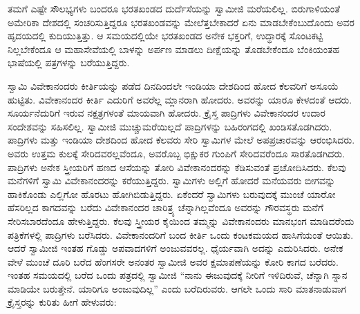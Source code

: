  ತಮಗೆ ಎಷ್ಟೇ ಸೌಲಭ್ಯಗಳು ಬಂದರೂ ಭರತಖಂಡದ ದುರ್ದೆಸೆಯನ್ನು ಸ್ವಾಮೀಜಿ ಮರೆಯಲಿಲ್ಲ. ಬಿರುಗಾಳಿಯಂತೆ ಅಮೇರಿಕಾ ದೇಶದಲ್ಲಿ ಸಂಚರಿಸುತ್ತಿದ್ದರೂ ಭರತಖಂಡವನ್ನು ಮೇಲೆತ್ತಬೇಕಾದರೆ ಏನು ಮಾಡಬೇಕೆಂಬುದೊಂದು ಅವರ ಹೃದಯದಲ್ಲಿ ಕುದಿಯುತ್ತಿತ್ತು. ಆ ಸಮಯದಲ್ಲಿಯೇ ಭರತಖಂಡದ ಅನೇಕ ಭಕ್ತರಿಗೆ, ಉದ್ಧಾರಕ್ಕೆ ಸೊಂಟಕಟ್ಟಿ ನಿಲ್ಲಬೇಕೆಂದೂ ಆ ಮಹಾಸೇವೆಯಲ್ಲಿ ಬಾಳನ್ನು ಅರ್ಪಣ ಮಾಡಲು ದೀಕ್ಷೆಯನ್ನು ತೊಡಬೇಕೆಂದೂ ಬೆಂಕಿಯಂತಹ ಭಾಷೆಯಲ್ಲಿ ಪತ್ರಗಳನ್ನು ಬರೆಯುತ್ತಿದ್ದರು. 

 ಸ್ವಾಮಿ ವಿವೇಕಾನಂದರು ಕೀರ್ತಿಯನ್ನು ಪಡೆದ ದಿನದಿಂದಲೇ ಇಂಡಿಯಾ ದೇಶದಿಂದ ಹೋದ ಕೆಲವರಿಗೆ ಅಸೂಯೆ ಹುಟ್ಟಿತು. ವಿವೇಕಾನಂದರ ಕೀರ್ತಿ ಎದುರಿಗೆ ಅವರೆಲ್ಲ ಮ್ಲಾನರಾಗಿ ಹೋದರು. ಅವರನ್ನು ಯಾರೂ ಕೇಳದಂತೆ ಆದರು. ಸೂರ್ಯನೆದುರಿಗೆ ಇರುವ ನಕ್ಷತ್ರಗಳಂತೆ ಮಾಯವಾಗಿ ಹೋದರು. ಕ್ರೈಸ್ತ ಪಾದ್ರಿಗಳು ವಿವೇಕಾನಂದರ ಉದಾರ ಸಂದೇಶವನ್ನು ಸಹಿಸಲಿಲ್ಲ. ಸ್ವಾಮೀಜಿ ಮುಚ್ಚುಮರೆಯಿಲ್ಲದೆ ಪಾದ್ರಿಗಳನ್ನು ಬಹಿರಂಗದಲ್ಲಿ ಖಂಡಿಸತೊಡಗಿದರು. ಪಾದ್ರಿಗಳು ಮತ್ತು ಇಂಡಿಯಾ ದೇಶದಿಂದ ಹೋದ ಕೆಲವರು ಸೇರಿ ಸ್ವಾಮಿಗಳ ಮೇಲೆ ಅಪಪ್ರಚಾರವನ್ನು ಆರಂಭಿಸಿದರು. ಅವರು ಉತ್ತಮ ಕುಲಕ್ಕೆ ಸೇರಿದವರಲ್ಲವೆಂದೂ, ಅವರೊಬ್ಬ ಭಿಕ್ಷುಕರ ಗುಂಪಿಗೆ ಸೇರಿದವರೆಂದೂ ಸಾರತೊಡಗಿದರು. ಪಾದ್ರಿಗಳು ಅನೇಕ ಸ್ತ್ರೀಯರಿಗೆ ಹಣದ ಆಸೆಯನ್ನು ತೋರಿ ವಿವೇಕಾನಂದರನ್ನು ಕೆಡಿಸುವಂತೆ ಪ್ರಚೋದಿಸಿದರು. ಕೆಲವು ಮನೆಗಳಿಗೆ ಸ್ವಾಮಿ ವಿವೇಕಾನಂದರನ್ನು ಕರೆಯುತ್ತಿದ್ದರು. ಸ್ವಾಮಿಗಳು ಅಲ್ಲಿಗೆ ಹೋದರೆ ಮನೆಯವರು ಬೀಗವನ್ನು ಹಾಕಿಕೊಂಡು ಎಲ್ಲಿಗೋ ಹೊರಟು ಹೋಗಿಬಿಡುತ್ತಿದ್ದರು. ಏಕೆಂದರೆ ಸ್ವಾಮಿಗಳು ಬರುವುದಕ್ಕೆ ಮುಂಚೆ ಯಾರೋ ಹೆಸರಿಲ್ಲದ ಕಾಗದವನ್ನು ಬರೆದು ವಿವೇಕಾನಂದರ ಚಾರಿತ್ರ್ಯ ಚೆನ್ನಾಗಿಲ್ಲವೆಂದೂ ಅವರನ್ನು ಗೌರವಸ್ಥರು ಮನೆಗೆ ಸೇರಿಸಬಾರದೆಂದೂ ಹೇಳುತ್ತಿದ್ದರು. ಕೆಲವು ಸ್ತ್ರೀಯರ ಕೈಯಿಂದ ತಮ್ಮನ್ನು ವಿವೇಕಾನಂದರು ಮಾನಭಂಗ ಮಾಡಿದರೆಂದು ಪತ್ರಿಕೆಗಳಲ್ಲಿ ಪಾದ್ರಿಗಳು ಬರೆಸಿದರು. ವಿವೇಕಾನಂದರಿಗೆ ಬಂದ ಕೀರ್ತಿ ಒಂದು ಕಂಟಕಮಯದ ಹಾಸಿಗೆಯಂತೆ ಆಯಿತು. ಆದರೆ ಸ್ವಾಮೀಜಿ ಇಂತಹ ಗೊಡ್ಡು ಅಪವಾದಗಳಿಗೆ ಅಂಜುವವರಲ್ಲ. ಧೈರ್ಯವಾಗಿ ಅದನ್ನು ಎದುರಿಸಿದರು. ಅನೇಕ ವೇಳೆ ಮುಂಚೆ ದೂರಿ ಬರೆದ ಹೆಂಗಸರೇ ಅನಂತರ ಸ್ವಾಮೀಜಿ ಅವರ ಕ್ಷಮಾಪಣೆಯನ್ನು ಕೋರಿ ಕಾಗದ ಬರೆದರು. ಇಂತಹ ಸಮಯದಲ್ಲಿ ಬರೆದ ಒಂದು ಪತ್ರದಲ್ಲಿ ಸ್ವಾಮೀಜಿ “ನಾನು ಈಜುವುದಕ್ಕೆ ನೀರಿಗೆ ಇಳಿದಿರುವೆ, ಚೆನ್ನಾಗಿ ಸ್ನಾನ ಮಾಡಿಯೇ ಬರುತ್ತೇನೆ. ಯಾರಿಗೂ ಅಂಜುವುದಿಲ್ಲ” ಎಂದು ಬರೆದಿರುವರು. ಆಗಲೇ ಒಂದು ಸಾರಿ ಮಾತನಾಡುವಾಗ ಕ್ರೈಸ್ತರನ್ನು ಕುರಿತು ಹೀಗೆ ಹೇಳುವರು: 

